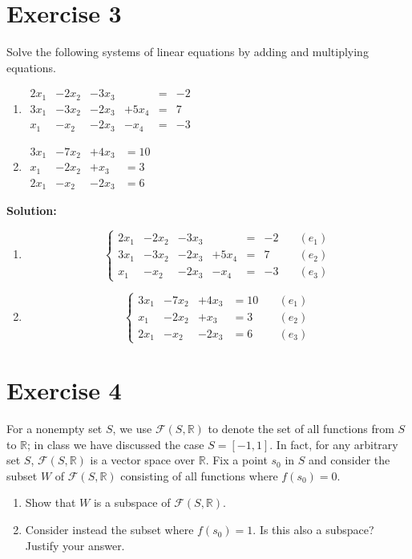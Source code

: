 \documentclass{article}
\begin{document}
\section*{Exercise 3}
Solve the following systems of linear equations by adding and multiplying equations.
\begin{enumerate}[label=(\alph*)]
\item $\begin{aligned}
2x_1&-2x_2&-3x_3& &= &-2 \\
3x_1&-3x_2&-2x_3&+5x_4 &= &7 \\
x_1&-x_2&-2x_3&-x_4 &= &-3
\end{aligned}$

\item $\begin{aligned}
3x_1&-7x_2&+4x_3 &= 10 \\
x_1&-2x_2&+x_3 &= 3 \\
2x_1&-x_2&-2x_3 &= 6
\end{aligned}$
\end{enumerate}

\textbf{Solution:} \\

\begin{enumerate}[label=(\alph*)]
\item 
\[\left\{
\begin{aligned}
2x_1&-2x_2&-3x_3& &= &-2 &\quad (e_1)\\
3x_1&-3x_2&-2x_3&+5x_4 &= &7 &\quad (e_2)\\
x_1&-x_2&-2x_3&-x_4 &= &-3 &\quad (e_3)
\end{aligned}
\right.
\]

\item 
\[
\left\{
\begin{aligned}
3x_1&-7x_2&+4x_3 &= 10 &\quad (e_1)\\
x_1&-2x_2&+x_3 &= 3 &\quad (e_2)\\
2x_1&-x_2&-2x_3 &= 6 &\quad (e_3)
\end{aligned}
\right.
\]
\end{enumerate}

\newpage

\section*{Exercise 4}
For a nonempty set $S$, we use $\mathcal{F}(S,\mathbb{R})$ to denote the set of all functions from $S$ to $\mathbb{R}$; in class we have discussed the case $S = [-1,1]$. In fact, for any arbitrary set $S$, $\mathcal{F}(S,\mathbb{R})$ is a vector space over $\mathbb{R}$. Fix a point $s_0$ in $S$ and consider the subset $W$ of $\mathcal{F}(S,\mathbb{R})$ consisting of all functions where $f(s_0) = 0$.
\begin{enumerate}[label=(\alph*)]
\item Show that $W$ is a subspace of $\mathcal{F}(S,\mathbb{R})$.
\item Consider instead the subset where $f(s_0) = 1$. Is this also a subspace? Justify your answer.
\end{enumerate}
\end{document}
